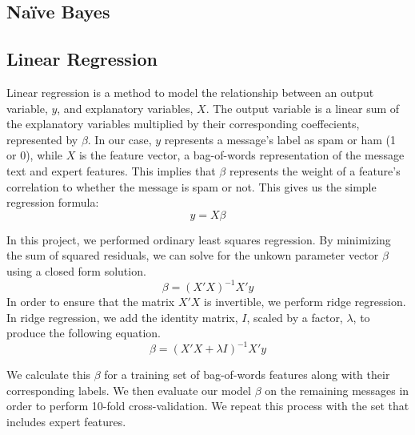\documentclass[preprint]{acm_proc_article-sp}
\begin{document}
\subsection{Na\"ive Bayes}

%
%
\subsection{Linear Regression}

Linear regression is a method to model the relationship between an output variable, 
$y$, and explanatory variables, $X$. The output variable is a linear sum of the explanatory 
variables multiplied by their corresponding coeffecients, represented by $\beta$. 
In our case, $y$ represents a message's label as spam or ham (1 or 0), 
while $X$ is the feature vector, a bag-of-words representation of the message text and expert features. 
This implies that $\beta$ represents the weight of a feature's correlation to whether 
the message is spam or not. This gives us the simple regression formula: $$y=X\beta$$

In this project, we performed ordinary least squares regression. By minimizing the sum of squared 
residuals, we can solve for the unkown parameter vector $\beta$ using a closed form solution. 
$$\beta=(X'X)^{-1}X'y$$ In order to ensure that the matrix $X'X$ is invertible, we perform ridge regression. 
In ridge regression, we add the identity matrix, $I$, scaled by a factor, $\lambda$, to 
produce the following equation. $$\beta=(X'X+\lambda I)^{-1}X'y$$

We calculate this $\beta$ for a training set of bag-of-words features along with their corresponding labels. 
We then evaluate our model $\beta$ on the remaining messages in order to perform 10-fold cross-validation. 
We repeat this process with the set that includes expert features.
\end{document}
